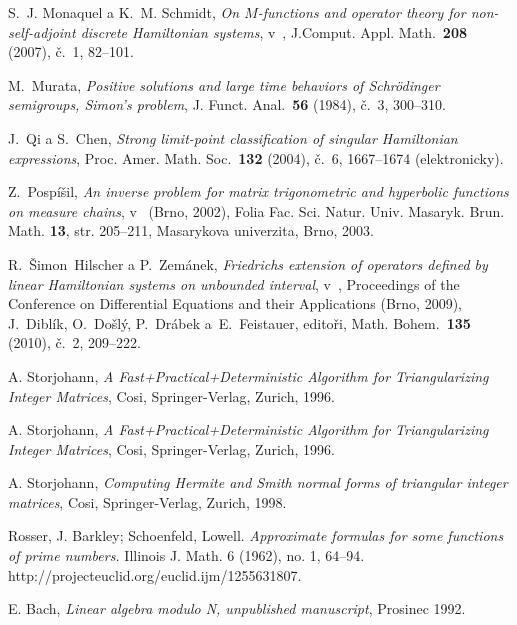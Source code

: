 \begin{thebibliography}{10}

S.~J. Monaquel a K.~M. Schmidt, \textit{On $M$-functions and operator
  theory for non-self-adjoint discrete Hamiltonian systems}, v~, J.Comput. Appl.
  Math.~\textbf{208} (2007), \v{c}.~1, 82--101.

M.~Murata, \textit{Positive solutions and large time behaviors of
  Schrödinger semigroups, Simon's problem}, J. Funct. Anal.~\textbf{56}
  (1984), č.~3, 300--310.

J.~Qi a S.~Chen, \textit{Strong limit-point classification of singular
  Hamiltonian expressions}, Proc. Amer. Math. Soc.~\textbf{132} (2004),
  č.~6, 1667--1674 (elektronicky).

Z.~Pospíšil, \textit{An inverse problem for matrix trigonometric and
  hyperbolic functions on measure chains}, v~ (Brno, 2002), Folia Fac.
  Sci. Natur. Univ. Masaryk. Brun. Math. {\bf 13}, str. 205--211, Masarykova
  univerzita, Brno, 2003.

R.~Šimon~Hilscher a P.~Zemánek, \textit{Friedrichs extension of
  operators defined by linear Hamiltonian systems on unbounded interval},
  v~, Proceedings of the Conference on Differential Equations and
  their Applications (Brno, 2009), J.~Diblík, O.~Došlý, P.~Drábek
  a~E.~Feistauer, editoři, Math. Bohem.~\textbf{135} (2010),
  č.~2, 209--222.

A. Storjohann, \textit{A Fast+Practical+Deterministic Algorithm for Triangularizing Integer Matrices},
Cosi, Springer-Verlag, Zurich, 1996.

A. Storjohann, \textit{A Fast+Practical+Deterministic Algorithm for Triangularizing Integer Matrices},
Cosi, Springer-Verlag, Zurich, 1996.

A. Storjohann, \textit{Computing Hermite and Smith normal forms
of triangular integer matrices},
Cosi, Springer-Verlag, Zurich, 1998.

Rosser, J. Barkley; Schoenfeld, Lowell. \textit{Approximate formulas for some functions of prime numbers.} Illinois J. Math. 6 (1962), no. 1, 64--94. http://projecteuclid.org/euclid.ijm/1255631807.

E. Bach, \textit{Linear algebra modulo N, unpublished manuscript},
Prosinec 1992.


\end{thebibliography}
